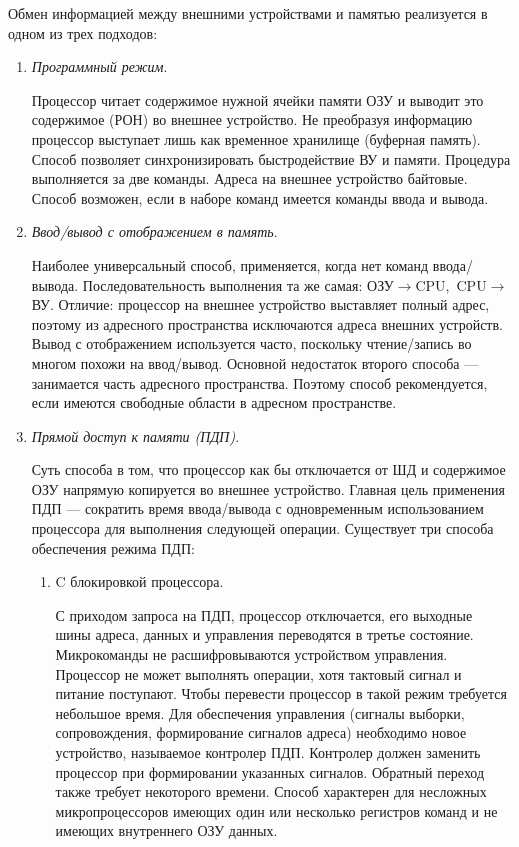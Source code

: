 \documentclass[unicode, 12pt, a4paper, oneside]{article}
\begin{document}
Обмен информацией между внешними устройствами и памятью реализуется в одном из трех подходов:
\begin{enumerate}
\item \textit{Программный режим}.
\par Процессор читает содержимое нужной ячейки памяти ОЗУ и выводит это содержимое (РОН) во внешнее устройство. Не преобразуя информацию процессор выступает лишь как временное хранилище (буферная память). Способ позволяет синхронизировать быстродействие ВУ и памяти. Процедура выполняется за две команды. Адреса на внешнее устройство байтовые. Способ возможен, если в наборе команд имеется команды ввода и вывода.

\item \textit{Ввод/вывод с отображением в память}.
\par Наиболее универсальный способ, применяется, когда нет команд ввода/вывода. Последовательность выполнения та же самая: \mbox{ОЗУ$\rightarrow $CPU, CPU$\rightarrow$ВУ}. Отличие: процессор на внешнее устройство выставляет полный адрес, поэтому из адресного пространства исключаются адреса внешних устройств. Вывод с отображением используется часто, поскольку чтение/запись во многом похожи на ввод/вывод. Основной недостаток второго способа — занимается часть адресного пространства. Поэтому способ рекомендуется, если имеются свободные области в адресном пространстве.

\item \textit{Прямой доступ к памяти (ПДП)}.
\par Суть способа в том, что процессор как бы отключается от ШД и содержимое ОЗУ  напрямую копируется во внешнее устройство. Главная цель применения ПДП — сократить время ввода/вывода с одновременным использованием процессора для выполнения следующей операции. Существует три способа обеспечения режима ПДП:
	\begin{enumerate}
	\item C блокировкой процессора.
	\par С приходом запроса на ПДП, процессор отключается, его выходные шины адреса, данных и управления переводятся в третье состояние. Микрокоманды не расшифровываются устройством управления. Процессор не может выполнять операции, хотя тактовый сигнал и питание поступают. Чтобы перевести процессор в такой режим требуется небольшое время. Для обеспечения управления (сигналы выборки, сопровождения, формирование сигналов адреса) необходимо новое устройство, называемое контролер ПДП. Контролер должен заменить процессор при формировании указанных сигналов. Обратный переход также требует некоторого времени. Способ характерен для несложных микропроцессоров имеющих один или несколько регистров команд и не имеющих внутреннего ОЗУ данных.
	

\end{enumerate}
\end{enumerate}
\end{document}
